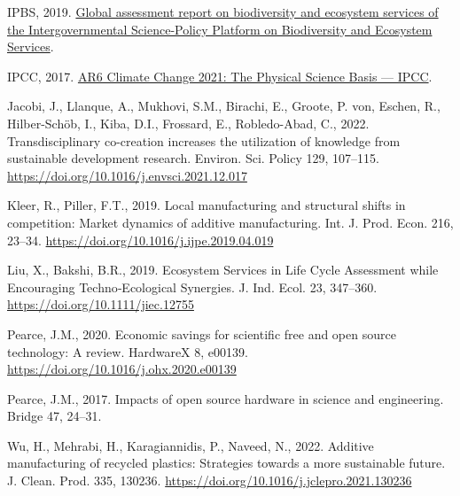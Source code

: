 \documentclass[
  11pt,
]{article}
\newlength{\cslhangindent}
\newlength{\cslentryspacingunit} %
\newenvironment{CSLReferences}[2] %
 {%
  \setlength{\parindent}{0pt}
  \ifodd #1
  \let\oldpar\par
  \def\par{\hangindent=\cslhangindent\oldpar}
  \fi
  \setlength{\parskip}{#2\cslentryspacingunit}
 }%
 {}
\begin{document}
\begin{CSLReferences}{1}{0}
\leavevmode{}%
IPBS, 2019.
\href{https://ipbes.net/global-assessment\%7B/\%\%7D0Ahttps://ipbes.net/global-assessment-report-biodiversity-ecosystem-services}{{Global
assessment report on biodiversity and ecosystem services of the
Intergovernmental Science-Policy Platform on Biodiversity and Ecosystem
Services}}.

\leavevmode{}%
IPCC, 2017.
\href{https://www.ipcc.ch/report/sixth-assessment-report-working-group-i/}{{AR6
Climate Change 2021: The Physical Science Basis --- IPCC}}.

\leavevmode{}%
Jacobi, J., Llanque, A., Mukhovi, S.M., Birachi, E., Groote, P. von,
Eschen, R., Hilber-Schöb, I., Kiba, D.I., Frossard, E., Robledo-Abad,
C., 2022. {Transdisciplinary co-creation increases the utilization of
knowledge from sustainable development research}. Environ. Sci. Policy
129, 107--115. \url{https://doi.org/10.1016/j.envsci.2021.12.017}

\leavevmode{}%
Kleer, R., Piller, F.T., 2019. {Local manufacturing and structural
shifts in competition: Market dynamics of additive manufacturing}. Int.
J. Prod. Econ. 216, 23--34.
\url{https://doi.org/10.1016/j.ijpe.2019.04.019}

\leavevmode{}%
Liu, X., Bakshi, B.R., 2019. {Ecosystem Services in Life Cycle
Assessment while Encouraging Techno‐Ecological Synergies}. J. Ind. Ecol.
23, 347--360. \url{https://doi.org/10.1111/jiec.12755}

\leavevmode{}%
Pearce, J.M., 2020. {Economic savings for scientific free and open
source technology: A review}. HardwareX 8, e00139.
\url{https://doi.org/10.1016/j.ohx.2020.e00139}

\leavevmode{}%
Pearce, J.M., 2017. {Impacts of open source hardware in science and
engineering}. Bridge 47, 24--31.

\leavevmode{}%
Wu, H., Mehrabi, H., Karagiannidis, P., Naveed, N., 2022. {Additive
manufacturing of recycled plastics: Strategies towards a more
sustainable future}. J. Clean. Prod. 335, 130236.
\url{https://doi.org/10.1016/j.jclepro.2021.130236}

\end{CSLReferences}

\appendix
\end{document}
